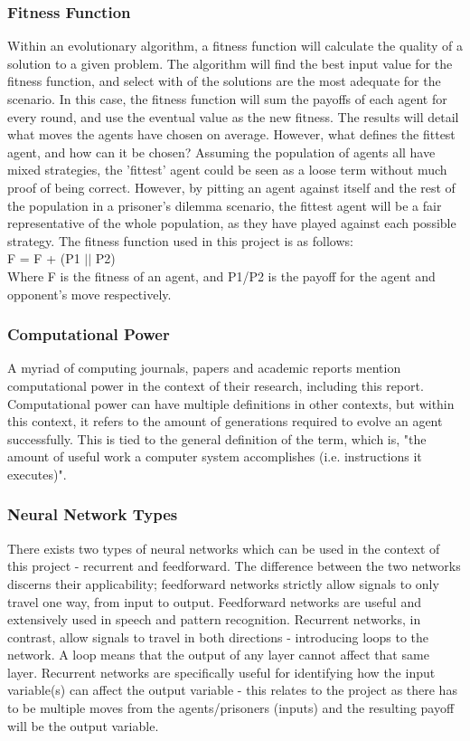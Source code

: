 \documentclass[12pt,a4paper]{article}
\begin{document}
\subsubsection{Fitness Function}
Within an evolutionary algorithm, a fitness function will calculate the quality of a solution to a given problem. The algorithm will find the best input value for the fitness function, and select with of the solutions are the most adequate for the scenario. In this case, the fitness function will sum the payoffs of each agent for every round, and use the eventual value as the new fitness. The results will detail what moves the agents have chosen on average. However, what defines the fittest agent, and how can it be chosen? Assuming the population of agents all have mixed strategies, the 'fittest' agent could be seen as a loose term without much proof of being correct. However, by pitting an agent against itself and the rest of the population in a prisoner's dilemma scenario, the fittest agent will be a fair representative of the whole population, as they have played against each possible strategy. The fitness function used in this project is as follows: \\

F = F + (P1 $||$  P2) \\

Where F is the fitness of an agent, and P1/P2 is the payoff for the agent and opponent's move respectively.

\subsubsection{Computational Power}
A myriad of computing journals, papers and academic reports mention computational power in the context of their research, including this report. Computational power can have multiple definitions in other contexts, but within this context, it refers to the amount of generations required to evolve an agent successfully. This is tied to the general definition of the term, which is, "the amount of useful work a computer system accomplishes (i.e. instructions it executes)".

\subsubsection{Neural Network Types}
There exists two types of neural networks which can be used in the context of this project - recurrent and feedforward. The difference between the two networks discerns their applicability; feedforward networks strictly allow signals to only travel one way, from input to output. Feedforward networks are useful and extensively used in speech and pattern recognition. Recurrent networks, in contrast, allow signals to travel in both directions - introducing loops to the network. A loop means that the output of any layer cannot affect that same layer. Recurrent networks are specifically useful for identifying how the input variable(s) can affect the output variable - this relates to the project as there has to be multiple moves from the agents/prisoners (inputs) and the resulting payoff will be the output variable.
\end{document}

